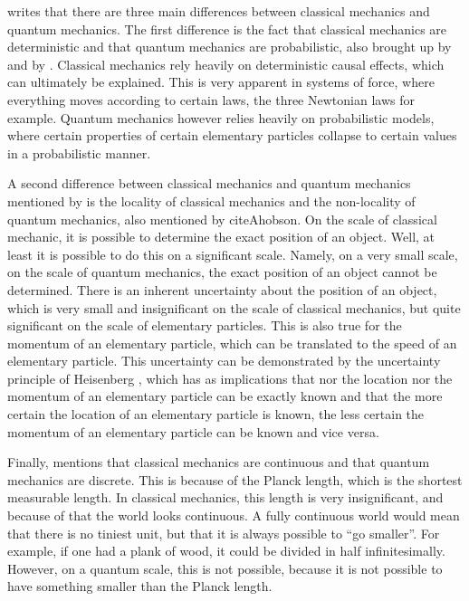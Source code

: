 \documentclass[11pt,twoside]{report} %
\begin{document}
 writes that there are three main differences between classical mechanics and quantum mechanics. The first difference is the fact that classical mechanics are deterministic and that quantum mechanics are probabilistic, also brought up by  and by . Classical mechanics rely heavily on deterministic causal effects, which can ultimately be explained. This is very apparent in systems of force, where everything moves according to certain laws, the three Newtonian laws for example. Quantum mechanics however relies heavily on probabilistic models, where certain properties of certain elementary particles collapse to certain values in a probabilistic manner.

A second difference between classical mechanics and quantum mechanics mentioned by  is the locality of classical mechanics and the non-locality of quantum mechanics, also mentioned by citeA{hobson}. On the scale of classical mechanic, it is possible to determine the exact position of an object. Well, at least it is possible to do this on a significant scale. Namely, on a very small scale, on the scale of quantum mechanics, the exact position of an object  cannot be determined. There is an inherent uncertainty about the position of an object, which is very small and insignificant on the scale of classical mechanics, but quite significant on the scale of elementary particles. This is also true for the momentum of an elementary particle, which can be translated to the speed of an elementary particle. This uncertainty can be demonstrated by the uncertainty principle of Heisenberg \cite{henriksen, muller, velentzas}, which has as implications that nor the location nor the momentum of an elementary particle can be exactly known and that the more certain the location of an elementary particle is known, the less certain the momentum of an elementary particle can be known and vice versa.

Finally,  mentions that classical mechanics are continuous and that quantum mechanics are discrete. This is because of the Planck length, which is the shortest measurable length. In classical mechanics, this length is very insignificant, and because of that the world looks continuous. A fully continuous world would mean that there is no tiniest unit, but that it is always possible to “go smaller”. For example, if one had a plank of wood, it could be divided in half infinitesimally. However, on a quantum scale, this is not possible, because it is not possible to have something smaller than the Planck length.
\end{document}
